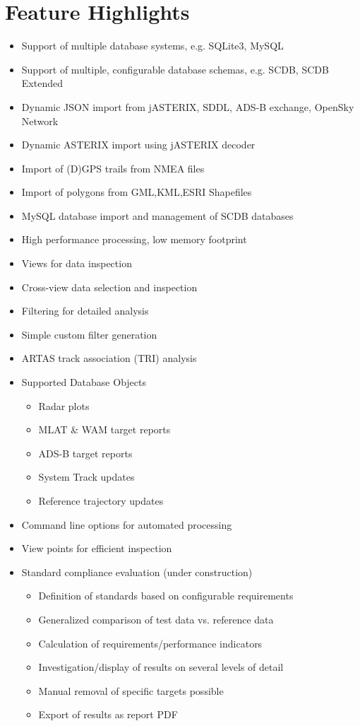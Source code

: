 \section{Feature Highlights}

\begin{itemize}  
\item Support of multiple database systems, e.g. SQLite3, MySQL
\item Support of multiple, configurable database schemas, e.g. SCDB, SCDB Extended
\item Dynamic JSON import from jASTERIX, SDDL, ADS-B exchange, OpenSky Network
\item Dynamic ASTERIX import using jASTERIX decoder
\item Import of (D)GPS trails from NMEA files
\item Import of polygons from GML,KML,ESRI Shapefiles
\item MySQL database import and management of SCDB databases
\item High performance processing, low memory footprint
\item Views for data inspection
\item Cross-view data selection and inspection
\item Filtering for detailed analysis
\item Simple custom filter generation
\item ARTAS track association (TRI) analysis
\item Supported Database Objects
\begin{itemize}  
\item Radar plots
\item MLAT \& WAM target reports
\item ADS-B target reports
\item System Track updates
\item Reference trajectory updates
\end{itemize}
\item Command line options for automated processing
\item View points for efficient inspection
\item Standard compliance evaluation (under construction)
\begin{itemize}  
\item Definition of standards based on configurable requirements
\item Generalized comparison of test data vs. reference data
\item Calculation of requirements/performance indicators
\item Investigation/display of results on several levels of detail
\item Manual removal of specific targets possible
\item Export of results as report PDF
\end{itemize}
\end{itemize} 
